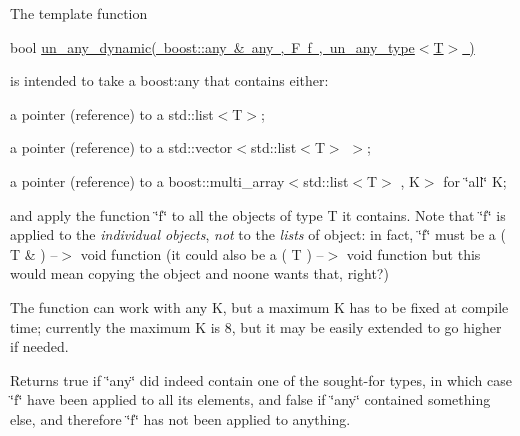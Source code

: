 The template function

bool \mbox{\hyperlink{group__boost__any__stuff_gaf12786a4337938023337a397d0077949}{un\+\_\+any\+\_\+dynamic( boost\+::any \& any , F f , un\+\_\+any\+\_\+type$<$\+T$>$ )}}

is intended to take a boost\+:any that contains either\+:


\begin{DoxyItemize}
\item a pointer (reference) to a std\+::list$<$\+T$>$;
\item a pointer (reference) to a std\+::vector$<$std\+::list$<$\+T$>$ $>$;
\item a pointer (reference) to a boost\+::multi\+\_\+array$<$std\+::list$<$\+T$>$ , K$>$ for \char`\"{}all\char`\"{} K;
\end{DoxyItemize}

and apply the function \char`\"{}f\char`\"{} to all the objects of type T it contains. Note that \char`\"{}f\char`\"{} is applied to the {\itshape individual objects}, {\itshape not} to the {\itshape lists} of object\+: in fact, \char`\"{}f\char`\"{} must be a ( T \& ) --$>$ void function (it could also be a ( T ) --$>$ void function but this would mean copying the object and noone wants that, right?)

The function can work with any K, but a maximum K has to be fixed at compile time; currently the maximum K is 8, but it may be easily extended to go higher if needed.

Returns true if \char`\"{}any\char`\"{} did indeed contain one of the sought-\/for types, in which case \char`\"{}f\char`\"{} have been applied to all its elements, and false if \char`\"{}any\char`\"{} contained something else, and therefore \char`\"{}f\char`\"{} has not been applied to anything. \mbox{\label{group__boost__any__stuff_gadaf95dbdadd3727f00ee8f2bcdbf29cf}} 
